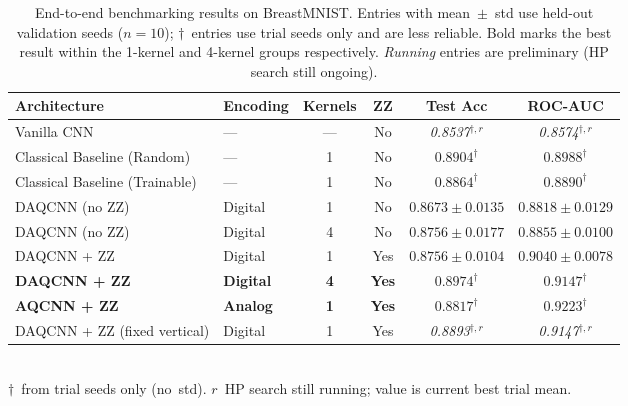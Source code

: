 \documentclass[11pt,a4paper]{article}
\begin{document}
\begin{table}[htbp]
    \centering
    \caption{End-to-end benchmarking results on BreastMNIST. Entries with
             mean~$\pm$~std use held-out validation seeds ($n{=}10$);
             $\dagger$~entries use trial seeds only and are less reliable.
             Bold marks the best result within the 1-kernel and 4-kernel
             groups respectively. \emph{Running} entries are preliminary
             (HP search still ongoing).}
    \begin{tabular}{l l c c c c}
        \toprule
        Architecture & Encoding & Kernels & ZZ & Test Acc & ROC-AUC \\
        \midrule
        Vanilla CNN              & ---     & ---  & No  & \emph{0.8537}$^{\dagger,r}$ & \emph{0.8574}$^{\dagger,r}$ \\
        Classical Baseline (Random)   & ---     & 1    & No  & $0.8904^\dagger$ & $0.8988^\dagger$ \\
        Classical Baseline (Trainable)& ---     & 1    & No  & $0.8864^\dagger$ & $0.8890^\dagger$ \\
        \midrule
        DAQCNN (no ZZ)           & Digital & 1    & No  & $0.8673 \pm 0.0135$ & $0.8818 \pm 0.0129$ \\
        DAQCNN (no ZZ)           & Digital & 4    & No  & $0.8756 \pm 0.0177$ & $0.8855 \pm 0.0100$ \\
        \midrule
        DAQCNN + ZZ              & Digital & 1    & Yes & $0.8756 \pm 0.0104$ & $0.9040 \pm 0.0078$ \\
        \textbf{DAQCNN + ZZ}     & \textbf{Digital} & \textbf{4} & \textbf{Yes} & $\bm{0.8974}^\dagger$ & $\bm{0.9147}^\dagger$ \\
        \textbf{AQCNN + ZZ}      & \textbf{Analog}  & \textbf{1} & \textbf{Yes} & $\bm{0.8817}^\dagger$ & $\bm{0.9223}^\dagger$ \\
        \midrule
        DAQCNN + ZZ (fixed vertical) & Digital & 1 & Yes & \emph{0.8893}$^{\dagger,r}$ & \emph{0.9147}$^{\dagger,r}$ \\
        \bottomrule
    \end{tabular}
    \smallskip\\
    \footnotesize $\dagger$~from trial seeds only (no~std). \quad
    $r$~HP search still running; value is current best trial mean.
\end{table}
\end{document}
